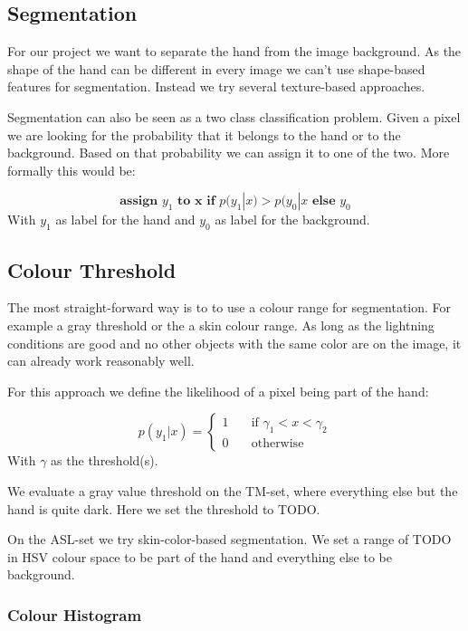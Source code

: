 \documentclass[letterpaper, 10 pt, conference]{ieeeconf}  %
\begin{document}
\subsection{Segmentation}

For our project we want to separate the hand from the image background. As the shape of the hand can be different in every image we can't use shape-based features for segmentation. Instead we try several texture-based approaches. 

Segmentation can also be seen as a two class classification problem. Given a pixel we are looking for the probability that it belongs to the hand or to the background. Based on that probability we can assign it to one of the two. More formally this would be:

\begin{equation}
	\textbf{assign } y_1 \textbf{ to x if } p(y_1|x) > p(y_0|x \textbf{ else } y_0
\end{equation}
With $y_1$ as label for the hand and $y_0$ as label for the background. 

\subsection{Colour Threshold}

The most straight-forward way is to to use a colour range for segmentation. For example a gray threshold or the a skin colour range. As long as the lightning conditions are good and no other objects with the same color are on the image, it can already work reasonably well. 

For this approach we define the likelihood of a pixel being part of the hand:

\begin{equation}
p(y_1 | x) = \begin{cases}
1 & \quad \text{if } \gamma_1 < x < \gamma_2 \\
0 & \quad \text{otherwise}
\end{cases}
\end{equation}
With $\gamma$ as the threshold(s).

We evaluate a gray value threshold on the TM-set, where everything else but the hand is quite dark. Here we set the threshold to TODO.

On the ASL-set we try skin-color-based segmentation. We set a range of TODO in HSV colour space to be part of the hand and everything else to be background.

\subsubsection{Colour Histogram}
\end{document}
